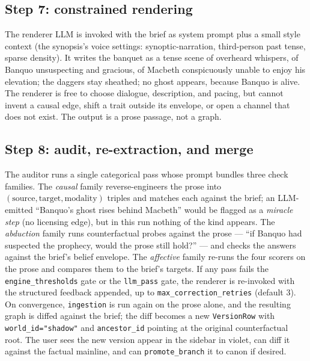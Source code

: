 \documentclass[11pt]{article}
\begin{document}
\subsection{Step 7: constrained rendering}
\label{app:wk-render}

The renderer LLM is invoked with the brief as system prompt plus
a small style context (the synopsis's voice settings:
synoptic-narration, third-person past tense, sparse density). It
writes the banquet as a tense scene of overheard whispers, of
Banquo unsuspecting and gracious, of Macbeth conspicuously
unable to enjoy his elevation; the daggers stay sheathed; no
ghost appears, because Banquo is alive. The renderer is free to
choose dialogue, description, and pacing, but cannot invent a
causal edge, shift a trait outside its envelope, or open a
channel that does not exist. The output is a prose passage, not
a graph.

\subsection{Step 8: audit, re-extraction, and merge}
\label{app:wk-audit}

The auditor runs a single categorical pass whose prompt bundles
three check families. The \emph{causal} family
reverse-engineers the prose into $(\text{source}, \text{target},
\text{modality})$ triples and matches each against the brief; an
LLM-emitted ``Banquo's ghost rises behind Macbeth'' would be
flagged as a \emph{miracle step} (no licensing edge), but in this
run nothing of the kind appears. The \emph{abduction} family runs
counterfactual probes against the prose --- ``if Banquo had
suspected the prophecy, would the prose still hold?'' --- and
checks the answers against the brief's belief envelope. The
\emph{affective} family re-runs the four scorers on the prose and
compares them to the brief's targets. If any pass fails the
\texttt{engine\_thresholds} gate or the \texttt{llm\_pass} gate,
the renderer is re-invoked with the structured feedback appended,
up to \texttt{max\_correction\_retries} (default 3). On
convergence, \texttt{ingestion} is run again on the prose alone,
and the resulting graph is diffed against the brief; the diff
becomes a new \texttt{VersionRow} with \texttt{world\_id="shadow"}
and \texttt{ancestor\_id} pointing at the original counterfactual
root. The user sees the new version appear in the sidebar in
violet, can diff it against the factual mainline, and can
\texttt{promote\_branch} it to canon if desired.
\end{document}
